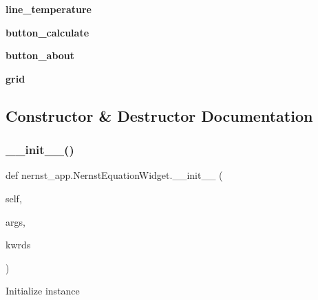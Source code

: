 \begin{DoxyCompactItemize}
\item 
\mbox{\label{classnernst__app_1_1NernstEquationWidget_ac64168fa96edd5eb2a62dc3f593408ff}} 
{\bfseries line\+\_\+temperature}
\item 
\mbox{\label{classnernst__app_1_1NernstEquationWidget_a105200e09f92728ab26decc617570482}} 
{\bfseries button\+\_\+calculate}
\item 
\mbox{\label{classnernst__app_1_1NernstEquationWidget_a6560987bece49d4430d51ba73859967a}} 
{\bfseries button\+\_\+about}
\item 
\mbox{\label{classnernst__app_1_1NernstEquationWidget_a5b98b39672cfcf4b8ee2f4326676f340}} 
{\bfseries grid}
\end{DoxyCompactItemize}


\subsection{Constructor \& Destructor Documentation}
\mbox{\label{classnernst__app_1_1NernstEquationWidget_a057e6f0d2c54065bbca9a3c7c2a87868}} 
\subsubsection{\texorpdfstring{\+\_\+\+\_\+init\+\_\+\+\_\+()}{\_\_init\_\_()}}
{\footnotesize\ttfamily def nernst\+\_\+app.\+Nernst\+Equation\+Widget.\+\_\+\+\_\+init\+\_\+\+\_\+ (\begin{DoxyParamCaption}\item[{}]{self,  }\item[{}]{args,  }\item[{}]{kwrds }\end{DoxyParamCaption})}

\begin{DoxyVerb}Initialize instance
\end{DoxyVerb}
 

